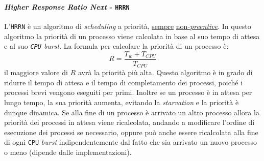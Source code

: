             \paragraph{\textit{Higher Response Ratio Next} - \texttt{HRRN}} L'\texttt{HRRN} è un algoritmo di \textit{scheduling} a priorità, \underline{sempre} \underline{non-\textit{preentive}}. In questo algoritmo la priorità di un processo viene calcolata in base al suo tempo di attesa e al suo \textit{\texttt{CPU} burst}. La formula per calcolare la priorità di un processo è: \[
                R = \frac{T_w + T_{CPU}}{T_{CPU}}
            \]
            il maggiore valore di $R$ avrà la priorità più alta. Questo algoritmo è in grado di ridurre il tempo di attesa e il tempo di completamento dei processi, poiché i processi brevi vengono eseguiti per primi. Inoltre se un processo è in attesa per lungo tempo, la sua priorità aumenta, evitando la \textit{starvation} e la priorità è dunque dinamica. Se alla fine di un processo è arrivato un altro processo allora la priorità dei processi in attesa viene ricalcolata, andando a modificare l'ordine di esecuzione dei processi se necessario, oppure può anche essere ricalcolata alla fine di ogni \texttt{CPU} \textit{burst} indipendentemente dal fatto che sia arrivato un nuovo processo o meno (dipende dalle implementazioni).
